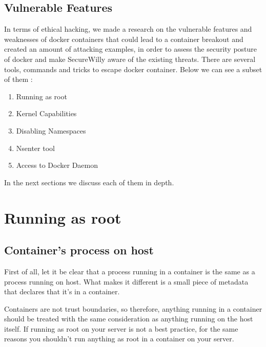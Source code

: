 \subsection{Vulnerable Features}
In terms of ethical hacking, we made a research on the vulnerable features and weaknesses of docker containers that could lead to a container breakout and created an amount of attacking examples, in order to assess the security posture of docker and make SecureWilly aware of the existing threats.
There are several tools, commands and tricks to escape docker container. Below we can see a subset of them \cite{onentryattacks}: 

\begin{enumerate}
\item Running as root
\item Kernel Capabilities
\item Disabling Namespaces
\item Nsenter tool
\item Access to Docker Daemon
\end{enumerate}

In the next sections we discuss each of them in depth.

\section{Running as root}
\subsection{Container's process on host}
First of all, let it be clear that a process running in a container is the same as a process running on host. What makes it different is a small piece of metadata that declares that it's in a container. \cite{runningroot}

Containers are not trust boundaries, so therefore, anything running in a container should be treated with the same consideration as anything running on the host itself.
If running as root on your server is not a best practice, for the same reasons you shouldn't run anything as root in a container on your server.
